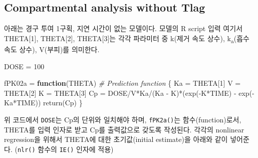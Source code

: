 \documentclass[
  11pt,
  krantz2, a4paper, twoside]{krantz}
\newenvironment{Shaded}{\begin{snugshade}}{\end{snugshade}}
\newcommand{\AttributeTok}[1]{\textcolor[rgb]{0.77,0.63,0.00}{#1}}
\newcommand{\CommentTok}[1]{\textcolor[rgb]{0.56,0.35,0.01}{\textit{#1}}}
\newcommand{\ControlFlowTok}[1]{\textcolor[rgb]{0.13,0.29,0.53}{\textbf{#1}}}
\newcommand{\DecValTok}[1]{\textcolor[rgb]{0.00,0.00,0.81}{#1}}
\newcommand{\FloatTok}[1]{\textcolor[rgb]{0.00,0.00,0.81}{#1}}
\newcommand{\FunctionTok}[1]{\textcolor[rgb]{0.00,0.00,0.00}{#1}}
\newcommand{\NormalTok}[1]{#1}
\newcommand{\OtherTok}[1]{\textcolor[rgb]{0.56,0.35,0.01}{#1}}
\newcommand{\SpecialCharTok}[1]{\textcolor[rgb]{0.00,0.00,0.00}{#1}}
\newcommand{\StringTok}[1]{\textcolor[rgb]{0.31,0.60,0.02}{#1}}
\theoremstyle{definition}
\theoremstyle{definition}
\theoremstyle{definition}
\theoremstyle{definition}
\theoremstyle{remark}
\begin{document}
\hypertarget{compartmental-analysis-without-tlag}{%
\subsection{Compartmental analysis without Tlag}\label{compartmental-analysis-without-tlag}}

아래는 경구 투여 1구획, 지연 시간이 없는 모델이다. 
모델의 R script 입력 여기서 THETA{[}1{]}, THETA{[}2{]}, THETA{[}3{]}는 각각 파라미터 중 k(제거 속도 상수), k\textsubscript{a}(흡수 속도 상수), V(부피)를 의미한다.

\begin{Shaded}
\begin{Highlighting}[]
\NormalTok{DOSE }\OtherTok{=} \DecValTok{100}

\NormalTok{fPK02a }\OtherTok{=} \ControlFlowTok{function}\NormalTok{(THETA) }\CommentTok{\# Prediction function}
\NormalTok{\{}
\NormalTok{  Ka }\OtherTok{=}\NormalTok{ THETA[}\DecValTok{1}\NormalTok{]}
\NormalTok{  V  }\OtherTok{=}\NormalTok{ THETA[}\DecValTok{2}\NormalTok{]}
\NormalTok{  K  }\OtherTok{=}\NormalTok{ THETA[}\DecValTok{3}\NormalTok{]}
\NormalTok{  Cp }\OtherTok{=}\NormalTok{ DOSE}\SpecialCharTok{/}\NormalTok{V}\SpecialCharTok{*}\NormalTok{Ka}\SpecialCharTok{/}\NormalTok{(Ka }\SpecialCharTok{{-}}\NormalTok{ K)}\SpecialCharTok{*}\NormalTok{(}\FunctionTok{exp}\NormalTok{(}\SpecialCharTok{{-}}\NormalTok{K}\SpecialCharTok{*}\NormalTok{TIME) }\SpecialCharTok{{-}} \FunctionTok{exp}\NormalTok{(}\SpecialCharTok{{-}}\NormalTok{Ka}\SpecialCharTok{*}\NormalTok{TIME))}
  \FunctionTok{return}\NormalTok{(Cp)}
\NormalTok{\}}
\end{Highlighting}
\end{Shaded}

위 코드에서 \texttt{DOSE}는 Cp의 단위와 일치해야 하며, \texttt{fPK2a()}는 함수(function)로서, THETA를 입력 인자로 받고 Cp를 출력값으로 갖도록 작성된다.
각각의 nonlinear regression을 위해서 THETA에 대한 초기값(initial estimate)을 아래와 같이 넣어준다. (\texttt{nlr()} 함수의 \texttt{IE()} 인자에 적용)

\begin{Shaded}
\end{Shaded}
\end{document}
